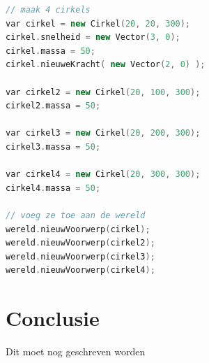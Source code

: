 \documentclass[12pt,a4paper]{article}
\begin{document}
	\begin{lstlisting}[language=C++]
// maak 4 cirkels
var cirkel = new Cirkel(20, 20, 300);
cirkel.snelheid = new Vector(3, 0);
cirkel.massa = 50;
cirkel.nieuweKracht( new Vector(2, 0) );

var cirkel2 = new Cirkel(20, 100, 300);
cirkel2.massa = 50;

var cirkel3 = new Cirkel(20, 200, 300);
cirkel3.massa = 50;

var cirkel4 = new Cirkel(20, 300, 300);
cirkel4.massa = 50;

// voeg ze toe aan de wereld
wereld.nieuwVoorwerp(cirkel);
wereld.nieuwVoorwerp(cirkel2);
wereld.nieuwVoorwerp(cirkel3);
wereld.nieuwVoorwerp(cirkel4);
	\end{lstlisting}
	
	\newpage
	
	\section{Conclusie}
	Dit moet nog geschreven worden
\end{document}
